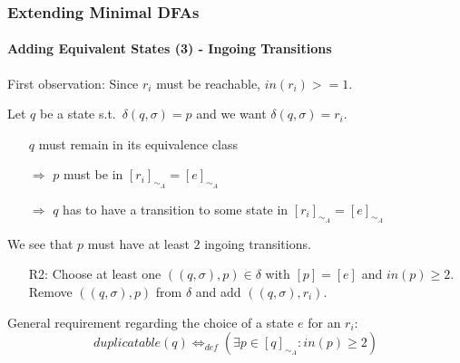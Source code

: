 \begin{frame}
	\frametitle{Extending Minimal DFAs}
	\framesubtitle{Adding Equivalent States (3) - Ingoing Transitions}
	
	First observation: Since $r_i$ must be reachable, $in(r_i) >= 1$.

	\vspace{0.2cm}
	Let $q$ be a state s.t.\ $\delta(q,\sigma)=p$ and we want $\delta(q,\sigma)=r_i$.
	
	\vspace{0.2cm}
	\begin{itemize}
		\item[] $q$ must remain in its equivalence class
		
		\item[$\Rightarrow$] $p$ must be in $[r_i]_{\sim_A} = [e]_{\sim_A}$
		
		\item[$\Rightarrow$] $q$ has to have a transition to some state in $[r_i]_{\sim_A} = [e]_{\sim_A}$
	\end{itemize}
	
	\vspace{0.2cm}
	We see that $p$ must have at least $2$ ingoing transitions.
	
	\vspace{0.2cm}
	\begin{itemize}
		\item[R2:] Choose at least one $((q, \sigma), p) \in \delta$ with $[p] = [e]$ and $in(p) \geq 2$. Remove $((q, \sigma), p)$ from $\delta$ and add $((q, \sigma), r_i)$.
	\end{itemize}

	\vspace{0.2cm}
	General requirement regarding the choice of a state $e$ for an $r_i$: 
	\[
		duplicatable(q) \Leftrightarrow_{def} (\exists p \in [q]_{\sim_A}\colon in(p) \geq 2)
	\]

\end{frame}
